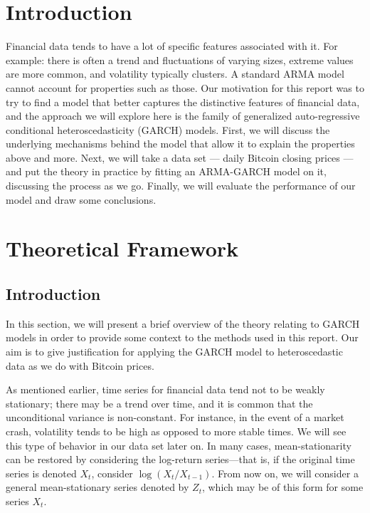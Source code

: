 \documentclass[12pt]{article}
\begin{document}
\thispagestyle{empty}

\newpage
{} %

\section{Introduction}
\label{sec:introduction}

Financial data tends to have a lot of specific features associated with it. For example: there is often a trend and fluctuations of varying sizes, extreme values are more common, and volatility typically clusters. A standard ARMA model cannot account for properties such as those. Our motivation for this report was to try to find a model that better captures the distinctive features of financial data, and the approach we will explore here is the family of generalized auto-regressive conditional  heteroscedasticity (GARCH) models. First, we will discuss the underlying mechanisms behind the model that allow it to explain the properties above and more. Next, we will take a data set --- daily Bitcoin closing prices --- and put the theory in practice by fitting an ARMA-GARCH model on it, discussing the process as we go. Finally, we will evaluate the performance of our model and draw some conclusions.

\section{Theoretical Framework}
\label{sec:theory}
\subsection{Introduction}
In this section, we will present a brief overview of the theory relating to GARCH models in order to provide some context to the methods used in this report. Our aim is to give justification for applying the GARCH model to heteroscedastic data as we do with Bitcoin prices.

As mentioned earlier, time series for financial data tend not to be weakly stationary; there may be a trend over time, and it is common that the unconditional variance is non-constant. For instance, in the event of a market crash, volatility tends to be high as opposed to more stable times. We will see this type of behavior in our data set later on. In many cases, mean-stationarity can be restored by considering the log-return series---that is, if the original time series is denoted $X_t$, consider $\log(X_t/X_{t-1})$. From now on, we will consider a general mean-stationary series denoted by $Z_t$, which may be of this form for some series $X_t$. 
\end{document}
